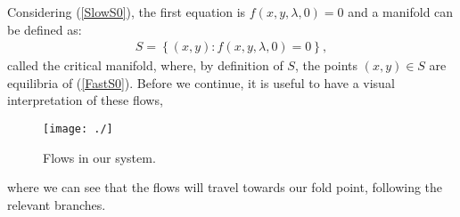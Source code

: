 Considering (\ref{SlowS0}), the first equation is $f(x,y,\lambda, 0)=0$ and a manifold can be defined as:
\begin{align} \label{CriticalS}
S= \left\{ (x,y) : f(x,y,\lambda, 0)=0 \right \},
\end{align}
called the critical manifold, where, by definition of $S$, the points $(x,y) \in S$ are equilibria of (\ref{FastS0}). Before we continue, it is useful to have a visual interpretation of these flows, 
\begin{figure}[h!]\centering
	\texttt{[image: ./]}
	\caption{Flows in our \vdp system.}
	\label{fig: vdp flow diagram}
\end{figure}
where we can see that the flows will travel towards our fold point, following the relevant branches.
